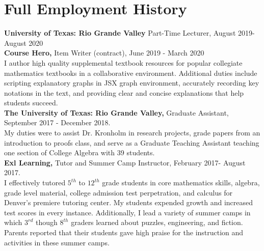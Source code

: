 \documentclass[letterpaper]{article}
\begin{document}
\section*{{\bf Full Employment History}}
{\bf University of Texas: Rio Grande Valley} Part-Time Lecturer, August 2019- August 2020 \\ %
{\bf Course Hero,} Item Writer (contract), June 2019 - March 2020 \\ 
{\small I author high quality supplemental textbook resources for popular collegiate mathematics textbooks in a collaborative environment. Additional duties include scripting explanatory graphs in JSX graph environment, accurately recording key notations in the text, and providing clear and concise explanations that help students succeed.  } \vspace{.2cm}\\
{\bf The University of Texas: Rio Grande Valley,} Graduate Assistant, September 2017 - December 2018.\\
{\small My duties were to assist Dr. Kronholm in research projects, grade papers from an introduction to proofs class, and serve as a Graduate Teaching Assistant teaching one section of College Algebra with 39 students.} 
\vspace{.2cm}\\
{\bf Exl Learning,} Tutor and Summer Camp Instructor, February 2017- August 2017.\\
{\small I effectively tutored $5^{th}$ to $12^{th}$ grade students in core mathematics skills, algebra, grade level material, college admission test perpetration, and calculus  for Denver's premiere tutoring center. My students expended growth and increased test scores in every instance.  Additionally, I lead a variety of summer camps in which $3^{rd}$ though $8^{th}$ graders learned about puzzles, engineering, and fiction. Parents reported that their students gave high praise for the instruction and activities in these summer camps.  }
\end{document}
